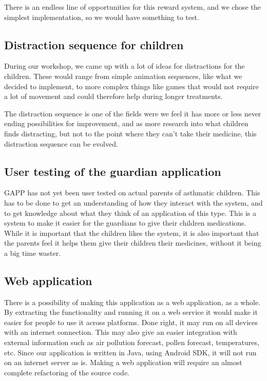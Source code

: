 There is an endless line of opportunities for this reward system, and we chose the simplest implementation, so we would have something to test. 

\subsection{Distraction sequence for children}
During our workshop, we came up with a lot of ideas for distractions for the children. These would range from simple animation sequences, like what we decided to implement, to more complex 
things like games that would not require a lot of movement and could therefore help during longer treatments. 

The distraction sequence is one of the fields were we feel it has more or less never ending possibilities for improvement, and as more research into what children finds distracting, but not to the point 
where they can't take their medicine, this distraction sequence can be evolved.


\subsection{User testing of the guardian application}
GAPP has not yet been user tested on actual parents of asthmatic children. This has to be done to get an understanding of how they interact with the system, and to get knowledge about what they think of an application of this type. This is a system to make it easier for the guardians to give their children medications. While it is important that the children likes the system, it is also important that the parents feel it helps them give their children their medicines, without it being a big time waster.

\subsection{Web application}
There is a possibility of making this application as a web application, as a whole. By extracting the functionality and running it on a web service it would make it easier for people to use it across platforms. Done right, it may run on all devices with an internet connection. This may also give an easier integration with external information such as air pollution forecast, pollen forecast, temperatures, etc. Since our application is written in Java, using Android SDK, it will not run on an internet server as is. Making a web application will require an almost complete refactoring of the source code.

